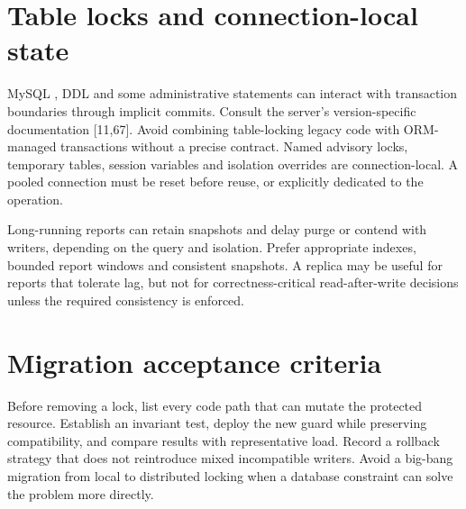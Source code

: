 \section{Table locks and connection-local state}
MySQL , DDL and some administrative statements can
interact with transaction boundaries through implicit commits. Consult the
server's version-specific documentation [11,67]. Avoid combining
table-locking legacy code with ORM-managed transactions without a precise
contract. Named advisory locks, temporary tables, session variables and
isolation overrides are connection-local. A pooled connection must be reset
before reuse, or explicitly dedicated to the operation.

Long-running reports can retain snapshots and delay purge or contend with
writers, depending on the query and isolation. Prefer appropriate indexes,
bounded report windows and consistent snapshots. A replica may be useful
for reports that tolerate lag, but not for correctness-critical read-after-write
decisions unless the required consistency is enforced.


\section{Migration acceptance criteria}
Before removing a lock, list every code path that can mutate the protected
resource. Establish an invariant test, deploy the new guard while preserving
compatibility, and compare results with representative load. Record a
rollback strategy that does not reintroduce mixed incompatible writers.
Avoid a big-bang migration from local to distributed locking when a database
constraint can solve the problem more directly.

